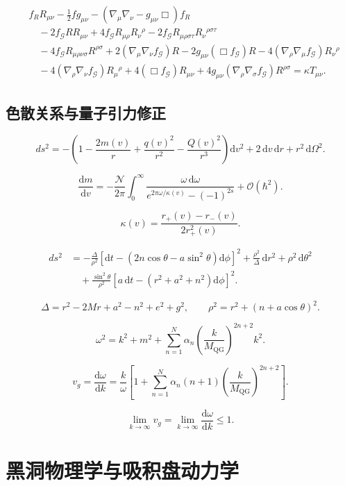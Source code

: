 \documentclass[UTF8,11pt,a4paper]{ctexart}
\newcommand{\G}{\mathcal{G}}
\newcommand{\N}{\mathcal{N}}
\newcommand{\dd}{\mathrm{d}}
\begin{document}
\begin{align*}
&f_R R_{\mu\nu}-\frac12 f g_{\mu\nu}
-\left(\nabla_\mu\nabla_\nu-g_{\mu\nu}\Box\right)f_R\\
&\quad-2f_{\G}RR_{\mu\nu}
+4f_{\G}R_{\mu\rho}R_\nu{}^{\rho}
-2f_{\G}R_{\mu\rho\sigma\tau}R_\nu{}^{\rho\sigma\tau}\\
&\quad-4f_{\G}R_{\mu\rho\nu\sigma}R^{\rho\sigma}
+2\left(\nabla_\mu\nabla_\nu f_{\G}\right)R
-2g_{\mu\nu}\left(\Box f_{\G}\right)R
-4\left(\nabla_\rho\nabla_\mu f_{\G}\right)R_\nu{}^{\rho}\\
&\quad-4\left(\nabla_\rho\nabla_\nu f_{\G}\right)R_\mu{}^{\rho}
+4\left(\Box f_{\G}\right)R_{\mu\nu}
+4g_{\mu\nu}\left(\nabla_\rho\nabla_\sigma f_{\G}\right)R^{\rho\sigma}
=\kappa T_{\mu\nu}.
\end{align*}

\subsection{色散关系与量子引力修正}

\[
ds^2=-\left(1-\frac{2m(v)}{r}+\frac{q(v)^2}{r^2}
-\frac{Q(v)^2}{r^3}\right)\dd v^2
+2\,\dd v\,\dd r+r^2\,\dd\Omega^2.
\]

\[
\frac{\dd m}{\dd v}
=-\frac{\N}{2\pi}\int_0^\infty
\frac{\omega\,\dd\omega}{e^{2\pi\omega/\kappa(v)}-(-1)^{2s}}
+\mathcal{O}(\hbar^2).
\]

\[
\kappa(v)=\frac{r_+(v)-r_-(v)}{2r_+^2(v)}.
\]

\begin{align*}
ds^2
&=-\frac{\Delta}{\rho^2}
\left[\dd t-\left(2n\cos\theta-a\sin^2\theta\right)\dd\phi\right]^2
+\frac{\rho^2}{\Delta}\,\dd r^2+\rho^2\,\dd\theta^2\\
&\quad+\frac{\sin^2\theta}{\rho^2}
\left[a\,\dd t-\left(r^2+a^2+n^2\right)\dd\phi\right]^2 .
\end{align*}

\[
\Delta=r^2-2Mr+a^2-n^2+e^2+g^2,\qquad
\rho^2=r^2+(n+a\cos\theta)^2.
\]

\[
\omega^2=k^2+m^2+\sum_{n=1}^{N}\alpha_n
\left(\frac{k}{M_{\mathrm{QG}}}\right)^{2n+2}k^2 .
\]

\[
v_g=\frac{\dd\omega}{\dd k}
=\frac{k}{\omega}\left[1+\sum_{n=1}^{N}\alpha_n(n+1)
\left(\frac{k}{M_{\mathrm{QG}}}\right)^{2n+2}\right].
\]

\[
\lim_{k\to\infty}v_g=\lim_{k\to\infty}\frac{\dd\omega}{\dd k}\le 1.
\]

\section{黑洞物理学与吸积盘动力学}
\end{document}
